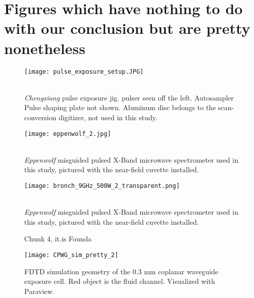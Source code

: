 \documentclass[fleqn,10pt]{article}
\begin{document}





\section{Figures which have nothing to do with our conclusion but are pretty nonetheless}

\begin{figure}[H]
	\captionsetup{singlelinecheck = false, justification=justified}
	\centering
	\texttt{[image: pulse\_exposure\_setup.JPG]}
	\caption{\\ \textit{Chengxiang} pulse exposure jig. pulser seen off the left. Autosampler Pulse shaping plate not shown. Aluminum disc belongs to the scan-conversion digitizer, not used in this study.}
\end{figure}
	
\begin{figure}[H]
	\captionsetup{singlelinecheck = false, justification=justified}
	\centering
	\texttt{[image: eppenwolf\_2.jpg]}
	\caption{\\ \textit{Eppenwolf} misguided pulsed X-Band microwave spectrometer used in this study, pictured with the near-field cuvette installed.}
\end{figure}

\begin{figure}[H]
	\captionsetup{singlelinecheck = false, justification=justified}
	\centering
	\texttt{[image: bronch\_9GHz\_500W\_2\_transparent.png]}
	\caption{\\ \textit{Eppenwolf} misguided pulsed X-Band microwave spectrometer used in this study, pictured with the near-field cuvette installed.}
\end{figure}




\begin{figure}[H]
	\caption{Chunk 4, it.is Founda}
\end{figure}


\clearpage


\begin{figure}[H]
	\captionsetup{singlelinecheck = false, justification=justified}
	\centering
	\texttt{[image: CPWG\_sim\_pretty\_2]}
	\caption{FDTD simulation geometry of the 0.3 mm coplanar waveguide exposure cell. Red object is the fluid channel. Visualized with Paraview.
		}
\end{figure}
\end{document}
